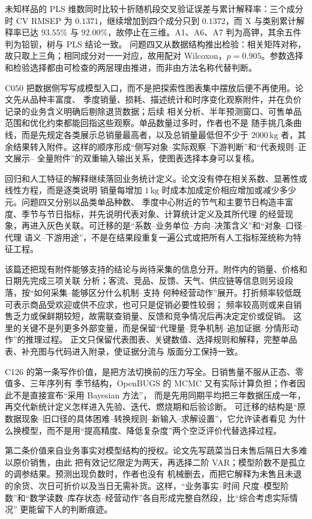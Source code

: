 未知样品的 PLS 维数同时比较十折随机段交叉验证误差与累计解释率：三个成分时 CV RMSEP 为
$0.1371$，继续增加到四个成分只到 $0.1372$，而 X 与类别累计解释率已达 $93.55\%$ 与
$92.00\%$，故停止在三维。A1、A6、A7 判为高钾，其余五件判为铅钡，树与 PLS 结论一致。
问题四又从数据结构推出检验：相关矩阵对称，故只取上三角；相同成分对一一对应，故用配对
Wilcoxon，$p=0.905$。参数选择和检验选择都由可检查的两层理由推进，而非由方法名称代替判断。

C050 把数据侧写写成模型入口，而不是把探索性图表集中摆放后便不再使用。论文先从品种丰富度、
季度销量、损耗、描述统计和时序变化观察附件，并在负价记录的业务含义明确后剔除退货数据；后续
相关分析、半年预测窗口、可售单品范围和优化约束都能回指这些观察。单品数量过多时，作者也不是
随手挑几条曲线，而是先规定各类展示总销量最高者，以及总销量最低但不少于 $2000\,\mathrm{kg}$
者，其余结果转入附件。这样的顺序形成“侧写对象--实际观察--下游判断”和“代表规则--正文展示--
全量附件”的双重输入输出关系，使图表选择本身可以复核。

回归和人工特征的解释继续落回业务统计定义。论文没有停在相关系数、显著性或线性方程，而是逐类说明
销量每增加 $1\,\mathrm{kg}$ 时成本加成定价相应增加或减少多少元。问题四又分别以品类单品种数、
季度中心附近的节气和主要节日构造丰富度、季节与节日指标，并先说明代表对象、计算统计定义及其所代理
的经营现象，再进入灰色关联。可迁移的是“系数--业务单位--方向--决策含义”和“对象--口径--代理
语义--下游用途”，不是在结果段重复一遍公式或把所有人工指标笼统称为特征工程。

该篇还把现有附件能够支持的结论与尚待采集的信息分开。附件内的销量、价格和日期先完成三项关联
分析；客流、竞品、反馈、天气、供应链等信息则另设段落，按“如何采集--能够区分什么机制--支持
何种经营动作”展开。打折频率较低既可表示商品受欢迎或供不应求，也可只是促销必要性较弱；
频率较高则或来自销售乏力或保鲜期较短，故需联查销量、反馈和竞争情况后再决定定价或促销。
这里的关键不是列更多外部变量，而是保留“代理量--竞争机制--追加证据--分情形动作”的推理过程。
正文只保留代表图表、关键数值、选择规则和解释，完整单品表、补充图与代码进入附录，使证据分流与
版面分工保持一致。

C126 的第一条写作价值，是把方法切换前的压力写全。日销售量不服从正态、零值多、三年序列有
季节结构，OpenBUGS 的 MCMC 又有实际计算负担；作者因此不是直接宣布“采用 Bayesian 方法”，
而是先用同期平均把三年数据压成一年，再交代新统计定义怎样进入先验、迭代、燃烧期和后验诊断。
可迁移的结构是“原数据现象--旧口径的具体困难--转换规则--新输入--求解设置”，它允许读者看见
为什么换模型，而不是用“提高精度、降低复杂度”两个空泛评价代替选择过程。

第二条价值来自业务事实对模型结构的授权。论文先写蔬菜当日未售后隔日大多难以原价销售，由此
把有效记忆限定为两天，再选择二阶 VAR；模型阶数不是孤立的调参结果。预测出现负数时，作者也没有
机械删去，而把它解释为未售且未退的余货、次日可折价以及当日无需补货。这样，“业务事实--时间
尺度--模型阶数”和“数学读数--库存状态--经营动作”各自形成完整自然段，比“综合考虑实际情况”
更能留下人的判断痕迹。

